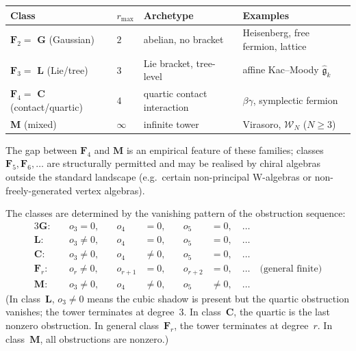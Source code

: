 \begin{center}
\small
\begin{tabular}{llll}
\textbf{Class} & \textbf{$r_{\max}$} & \textbf{Archetype}
 & \textbf{Examples} \\ \hline
$\mathbf{F}_2=$ \textbf{G} (Gaussian)
 & $2$ & abelian, no bracket
 & Heisenberg, free fermion, lattice \\[2pt]
$\mathbf{F}_3=$ \textbf{L} (Lie/tree)
 & $3$ & Lie bracket, tree-level
 & affine Kac--Moody $\widehat{\mathfrak{g}}_k$ \\[2pt]
$\mathbf{F}_4=$ \textbf{C} (contact/quartic)
 & $4$ & quartic contact interaction
 & $\beta\gamma$, symplectic fermion \\[2pt]
\textbf{M} (mixed)
 & $\infty$ & infinite tower
 & Virasoro, $\mathcal{W}_N$ ($N \ge 3$)
\end{tabular}
\end{center}
The gap between $\mathbf{F}_4$ and $\mathbf{M}$ is an empirical
feature of these families; classes
$\mathbf{F}_5,\mathbf{F}_6,\ldots$ are structurally permitted and
may be realised by chiral algebras outside the standard landscape
(e.g.\ certain non-principal W-algebras or non-freely-generated
vertex algebras).

The classes are determined by the vanishing pattern of the
obstruction sequence:
\begin{alignat}{3}
\textbf{G}: &\quad o_3 = 0, &\quad o_4 &= 0, &\quad o_5 &= 0, \quad \ldots
\label{eq:thqg-intro-vanishing-G} \\
\textbf{L}: &\quad o_3 \ne 0, &\quad o_4 &= 0, &\quad o_5 &= 0, \quad \ldots
\label{eq:thqg-intro-vanishing-L} \\
\textbf{C}: &\quad o_3 \ne 0, &\quad o_4 &\ne 0, &\quad o_5 &= 0, \quad \ldots
\label{eq:thqg-intro-vanishing-C} \\
\mathbf{F}_r: &\quad o_r \ne 0, &\quad o_{r+1} &= 0, &\quad o_{r+2} &= 0, \quad \ldots
\quad\text{(general finite)}
\label{eq:thqg-intro-vanishing-Fr} \\
\textbf{M}: &\quad o_3 \ne 0, &\quad o_4 &\ne 0, &\quad o_5 &\ne 0, \quad \ldots
\label{eq:thqg-intro-vanishing-M}
\end{alignat}
(In class~\textbf{L}, $o_3 \ne 0$ means the cubic shadow is present
but the quartic obstruction vanishes; the tower terminates at
degree~$3$. In class~\textbf{C}, the quartic is the last nonzero
obstruction. In general class~$\mathbf{F}_r$, the tower terminates
at degree~$r$. In class~\textbf{M}, all obstructions are nonzero.)

